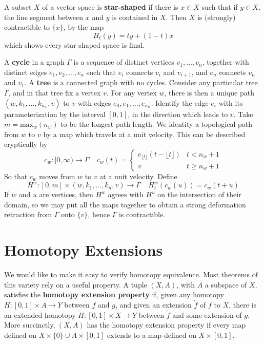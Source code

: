 \begin{example}
    A subset $X$ of a vector space is {\bf star-shaped} if there is $x \in X$ such that if $y \in X$, the line segment between $x$ and $y$ is contained in $X$. Then $X$ is (strongly) contractible to $\{ x \}$, by the map
    \[ H_t(y) = ty + (1 - t)x \]
    which shows every star shaped space is final.
\end{example}

\begin{example}
    A {\bf cycle} in a graph $\Gamma$ is a sequence of distinct vertices $v_1, \dots, v_n$, together with distinct edges $e_1, e_2, \dots, e_n$ such that $e_i$ connects $v_i$ and $v_{i+1}$, and $e_n$ connects $v_n$ and $v_1$. A {\bf tree} is a connected graph with no cycles. Consider any particular tree $\Gamma$, and in that tree fix a vertex $v$. For any vertex $w$, there is then a unique path $(w, k_1, \dots, k_{n_w}, v)$ to $v$ with edges $e_0, e_1, \dots, e_{n_w}$. Identify the edge $e_i$ with its parameterization by the interval $[0,1]$, in the direction which leads to $v$. Take $m = \text{max}_w(n_w)$ to be the longest path length. We identity a topological path from $w$ to $v$ by a map which travels at a unit velocity. This can be described cryptically by
    \[ c_w:[0,\infty) \to \Gamma\ \ \ \ \ c_w(t) = \begin{cases} e_{\lfloor t \rfloor}(t - \lfloor t \rfloor) & t < n_w + 1 \\ v & t \geq n_w + 1 \end{cases} \]
    So that $c_w$ moves from $w$ to $v$ at a unit velocity. Define
    \[ H^w: [0,m] \times (w, k_1, \dots, k_n, v) \to \Gamma\ \ \ \ \ H^w_t(c_w(u)) = c_w(t + u) \]
    If $w$ and $u$ are vertices, then $H^w$ agrees with $H^u$ on the intersection of their domain, so we may put all the maps together to obtain a strong deformation retraction from $\Gamma$ onto $\{ v \}$, hence $\Gamma$ is contractible.
\end{example}


\section{Homotopy Extensions}

We would like to make it easy to verify homotopy equivalence. Most theorems of this variety rely on a useful property. A tuple $(X,A)$, with $A$ a subspace of $X$, satisfies the {\bf homotopy extension property} if, given any homotopy $H: [0,1] \times A \to Y$ between $f$ and $g$, and given an extension $\tilde{f}$ of $f$ to $X$, there is an extended homotopy $\widetilde{H}: [0,1] \times X \to Y$ between $\tilde{f}$ and some extension of $g$. More succinctly, $(X,A)$ has the homotopy extension property if every map defined on $X \times \{ 0 \} \cup A \times [0,1]$ extends to a map defined on $X \times [0,1]$.

